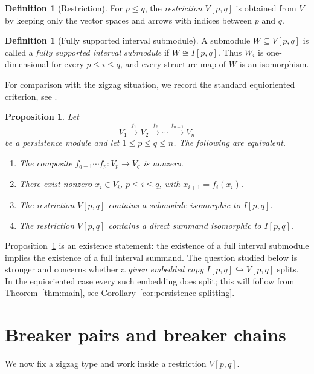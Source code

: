 \documentclass[11pt]{amsart}
\numberwithin{equation}{section}
\newtheorem{proposition}[theorem]{Proposition}
\theoremstyle{definition}
\newtheorem{definition}[theorem]{Definition}
\begin{document}
\begin{definition}[Restriction]
For $p\le q$, the \emph{restriction} $V[p,q]$ is obtained from $V$ by keeping
only the vector spaces and arrows with indices between $p$ and $q$.
\end{definition}

\begin{definition}[Fully supported interval submodule]
A submodule $W\subseteq V[p,q]$ is called a \emph{fully supported interval
submodule} if $W\cong I[p,q]$.  Thus $W_i$ is one-dimensional for every
$p\le i\le q$, and every structure map of $W$ is an isomorphism.
\end{definition}

For comparison with the zigzag situation, we record the standard
equioriented criterion, see \cite{CarlssonDeSilvaZigzag}. 

\begin{proposition}\label{prop:persistence}
Let
\[
V_1\xrightarrow{f_1}V_2\xrightarrow{f_2}\cdots
\xrightarrow{f_{n-1}}V_n
\]
be a persistence module and let $1\le p\le q\le n$.  The following are
equivalent.
\begin{enumerate}
\item The composite $f_{q-1}\cdots f_p:V_p\to V_q$ is nonzero.
\item There exist nonzero $x_i\in V_i$, $p\le i\le q$, with
$x_{i+1}=f_i(x_i)$.
\item The restriction $V[p,q]$ contains a submodule isomorphic to $I[p,q]$.
\item The restriction $V[p,q]$ contains a direct summand isomorphic to
$I[p,q]$.
\end{enumerate}
\end{proposition}

Proposition~\ref{prop:persistence} is an existence statement: the existence
of a full interval submodule implies the existence of a full interval
summand.  The question studied below is stronger and concerns whether a
\emph{given embedded copy} $I[p,q]\hookrightarrow V[p,q]$ splits.  In the
equioriented case every such embedding does split; this will follow from Theorem~\ref{thm:main}, see 
Corollary~\ref{cor:persistence-splitting}.

\section{Breaker pairs and breaker chains}\label{3}

We now fix a zigzag type and work inside a restriction $V[p,q]$.
\end{document}
